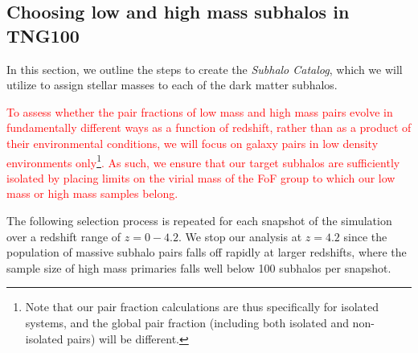 \documentclass[twocolumn]{aastex631}
\newcommand{\add}[1]{\textcolor{red}{#1}}
\newcommand{\subcat}{\textit{Subhalo Catalog}}
\begin{document}

    \subsection{Choosing low and high mass subhalos in TNG100} \label{sec:methods-halos}

    In this section, we outline the steps to create the \subcat, which we will utilize to assign stellar masses to each of the dark matter subhalos. 

    \add{To assess whether the pair fractions of low mass and high mass pairs evolve in fundamentally different ways as a function of redshift, rather than as a product of their environmental conditions, we will focus on galaxy pairs in low density environments only\footnote{Note that our pair fraction calculations are thus specifically for isolated systems, and the global pair fraction (including both isolated and non-isolated pairs) will be different.}.
    As such, we ensure that our target subhalos are sufficiently isolated by placing limits on the virial mass of the FoF group to which our low mass or high mass samples belong.}
    

    The following selection process is repeated for each snapshot of the simulation over a redshift range of $z=0-4.2$.  
    We stop our analysis at $z=4.2$ since the population of massive subhalo pairs falls off rapidly at larger redshifts, where the sample size of high mass primaries falls well below 100 subhalos per snapshot.
    
\end{document}
